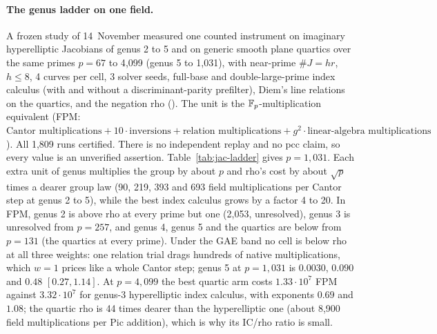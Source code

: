 \paragraph{The genus ladder on one field.} A frozen study of 14~November
measured one counted instrument on imaginary hyperelliptic Jacobians of
genus 2 to 5 and on generic smooth plane quartics over the same primes $p=67$
to 4{,}099 (genus 5 to 1{,}031), with near-prime $\#J=hr$, $h\le8$, 4 curves
per cell, 3 solver seeds, full-base and double-large-prime index calculus
(with and without a discriminant-parity prefilter), Diem's line relations on
the quartics, and the negation rho
(). The unit is the
$\mathbb{F}_p$-multiplication equivalent (FPM:
$\text{Cantor multiplications}+10\cdot\text{inversions}+\text{relation
multiplications}+g^2\cdot\text{linear-algebra multiplications}$). All 1{,}809
runs certified. There is no independent replay and no pcc claim, so every
value is an unverified assertion. Table~\ref{tab:jac-ladder} gives
$p=1{,}031$. Each extra unit of genus multiplies the group by about $p$ and
rho's cost by about $\sqrt p$ times a dearer group law (90, 219, 393 and 693
field multiplications per Cantor step at genus 2 to 5), while the best
index calculus grows by a factor 4 to 20. In FPM, genus 2 is above rho at
every prime but one (2{,}053, unresolved), genus 3 is unresolved from
$p=257$, and genus 4, genus 5 and the quartics are below from $p=131$ (the
quartics at every prime). Under the GAE band no cell is below rho at all
three weights: one relation trial drags hundreds of native multiplications,
which $w=1$ prices like a whole Cantor step; genus 5 at $p=1{,}031$ is
$0.0030$, $0.090$ and $0.48$ $[0.27,1.14]$. At $p=4{,}099$ the best quartic arm
costs $1.33\cdot10^7$ FPM against $3.32\cdot10^7$ for genus-3 hyperelliptic
index calculus, with exponents $0.69$ and $1.08$; the quartic rho is 44 times
dearer than the hyperelliptic one (about 8{,}900 field multiplications per
$\mathrm{Pic}$ addition), which is why its IC/rho ratio is small.

